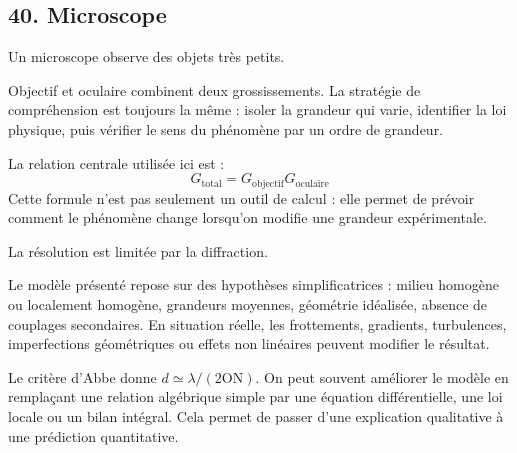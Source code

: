 \documentclass[11pt,a4paper]{article}
\begin{document}
\subsection{40. Microscope}

\begin{exemplebox}
Un microscope observe des objets très petits.
\end{exemplebox}

\begin{methodebox}
Objectif et oculaire combinent deux grossissements.
La stratégie de compréhension est toujours la même : isoler la grandeur qui varie, identifier la loi physique, puis vérifier le sens du phénomène par un ordre de grandeur.
\end{methodebox}

\begin{theorembox}
La relation centrale utilisée ici est :
\[
G_{\mathrm{total}}=G_{\mathrm{objectif}}G_{\mathrm{oculaire}}
\]
Cette formule n'est pas seulement un outil de calcul : elle permet de prévoir comment le phénomène change lorsqu'on modifie une grandeur expérimentale.
\end{theorembox}

\begin{odgbox}
La résolution est limitée par la diffraction.
\end{odgbox}

\begin{attentionbox}
Le modèle présenté repose sur des hypothèses simplificatrices : milieu homogène ou localement homogène, grandeurs moyennes, géométrie idéalisée, absence de couplages secondaires. En situation réelle, les frottements, gradients, turbulences, imperfections géométriques ou effets non linéaires peuvent modifier le résultat.
\end{attentionbox}

\begin{approfondissementbox}
Le critère d'Abbe donne $d\simeq \lambda/(2\mathrm{ON})$.
On peut souvent améliorer le modèle en remplaçant une relation algébrique simple par une équation différentielle, une loi locale ou un bilan intégral. Cela permet de passer d'une explication qualitative à une prédiction quantitative.
\end{approfondissementbox}
\end{document}
